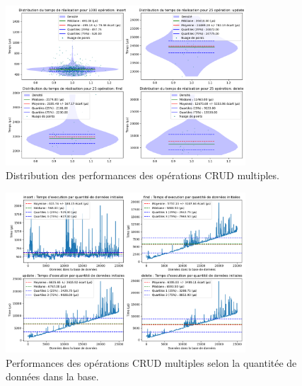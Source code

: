 \documentclass[12pt,a4paper]{report}
\begin{document}
        \begin{figure}[H]
            \centering
            \includegraphics[width=0.8\textwidth]{../plots/MongoDB/standalone/global_test_many.png}
            \caption{Distribution des performances des opérations CRUD multiples.}
            \label{fig:mongo_standalone_global_many}
        \end{figure}

        \begin{figure}[H]
            \centering
            \includegraphics[width=0.8\textwidth]{../plots/MongoDB/standalone/test_many_various_data.png}
            \caption{Performances des opérations CRUD multiples selon la quantitée de données dans la base.}
            \label{fig:mongo_standalone_many_various}
        \end{figure}
\end{document}
